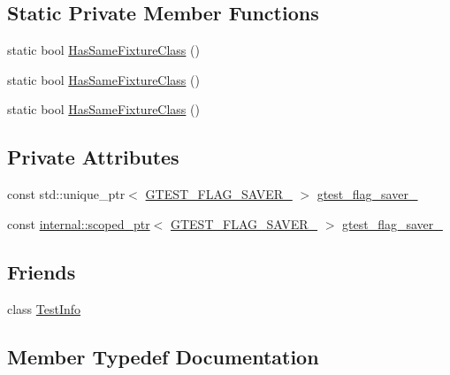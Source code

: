 \subsection*{Static Private Member Functions}
\begin{DoxyCompactItemize}
\item 
static bool \mbox{\hyperlink{classtesting_1_1_test_ab76536a462529a457429061e209a8ee7}{Has\+Same\+Fixture\+Class}} ()
\item 
static bool \mbox{\hyperlink{classtesting_1_1_test_a2d621c1300d3e850bcf1de70b57eb488}{Has\+Same\+Fixture\+Class}} ()
\item 
static bool \mbox{\hyperlink{classtesting_1_1_test_a2d621c1300d3e850bcf1de70b57eb488}{Has\+Same\+Fixture\+Class}} ()
\end{DoxyCompactItemize}
\subsection*{Private Attributes}
\begin{DoxyCompactItemize}
\item 
const std\+::unique\+\_\+ptr$<$ \mbox{\hyperlink{_obj__test_2lib_2googletest-release-1_88_81_2googletest_2include_2gtest_2internal_2gtest-port_8h_a3749ef4fba6b3c3993609b336031644d}{G\+T\+E\+S\+T\+\_\+\+F\+L\+A\+G\+\_\+\+S\+A\+V\+E\+R\+\_\+}} $>$ \mbox{\hyperlink{classtesting_1_1_test_aeab11ec3d1d6f9ff3cfe59b2c73c5454}{gtest\+\_\+flag\+\_\+saver\+\_\+}}
\item 
const \mbox{\hyperlink{classtesting_1_1internal_1_1scoped__ptr}{internal\+::scoped\+\_\+ptr}}$<$ \mbox{\hyperlink{_obj__test_2lib_2googletest-release-1_88_81_2googletest_2include_2gtest_2internal_2gtest-port_8h_a3749ef4fba6b3c3993609b336031644d}{G\+T\+E\+S\+T\+\_\+\+F\+L\+A\+G\+\_\+\+S\+A\+V\+E\+R\+\_\+}} $>$ \mbox{\hyperlink{classtesting_1_1_test_a132c542f6932107234988d05a9980e49}{gtest\+\_\+flag\+\_\+saver\+\_\+}}
\end{DoxyCompactItemize}
\subsection*{Friends}
\begin{DoxyCompactItemize}
\item 
class \mbox{\hyperlink{classtesting_1_1_test_aed3c96e2bd5a46339c1cbe49a4a233ee}{Test\+Info}}
\end{DoxyCompactItemize}


\subsection{Member Typedef Documentation}
\mbox{\label{classtesting_1_1_test_a5f2a051d1d99c9b784c666c586186cf9}} 

